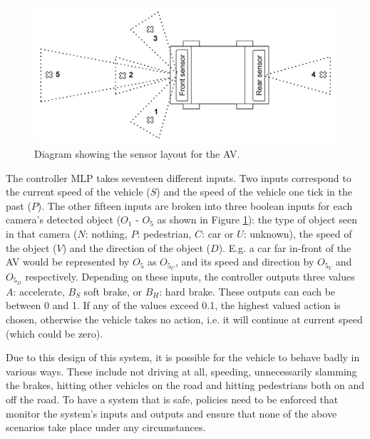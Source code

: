 \begin{figure}[t]
	\centering
	\includegraphics[width=\linewidth]{Content/fig/AV.pdf}
	\caption{Diagram showing the sensor layout for the \ac{AV}. \label{fig:av}}
\end{figure}

The controller \ac{MLP} takes seventeen different inputs. 
Two inputs correspond to the current speed of the vehicle ($S$) and the speed of the vehicle one tick in the past ($P$). 
The other fifteen inputs are broken into three boolean inputs for each camera's detected object ($O_1$ - $O_5$ as shown in Figure \ref{fig:av}): the type of object seen in that camera ($N$: nothing, $P$: pedestrian, $C$: car or $U$: unknown), the speed of the object ($V$) and the direction of the object ($D$).
E.g. a car far in-front of the \ac{AV} would be represented by $O_5$ as $O_{5_C}$, and its speed and direction by $O_{5_V}$ and $O_{5_D}$ respectively.
Depending on these inputs, the controller outputs three values  $A$: accelerate, $B_S$ soft brake, or $B_H$: hard brake.
These outputs can each be between 0 and 1.
If any of the values exceed 0.1, the highest valued action is chosen, otherwise the vehicle takes no action, i.e. it will continue at current speed (which could be zero).

Due to this design of this system, it is possible for the vehicle to behave badly in various ways. 
These include not driving at all, speeding, unnecessarily slamming the brakes, hitting other vehicles on the road and hitting pedestrians both on and off the road.
To have a system that is safe, policies need to be enforced that monitor the system's inputs and outputs and ensure that none of the above scenarios take place under any circumstances.

